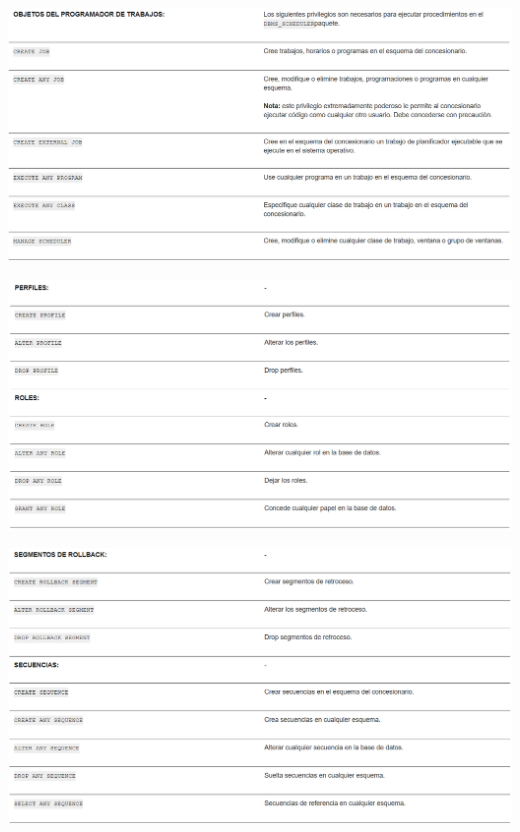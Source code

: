 \documentclass[12pt,letterpaper]{article}
\begin{document}
\begin{center}
  \includegraphics[width=14cm]{Imagenes/Privilegios_objetosprogramador.png}\\
\end{center}

\begin{center}
  \includegraphics[width=14cm]{Imagenes/Privilegios_perfilesroles.png}\\
\end{center}

\begin{center}
  \includegraphics[width=14cm]{Imagenes/Privilegios_segmentossecuencias.png}\\
\end{center}
\end{document}
